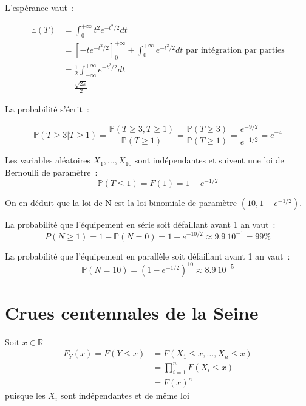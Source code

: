 L'espérance vaut~:

\begin{align*}
\mathbb{E}(T) &= \int_0^{+\infty} t^2 e^{-t^2/2} dt\\
        &= \left[-t e^{-t^2/2} \right]_0^{+\infty} + \int_0^{+\infty} e^{-t^2/2} dt \text{ par intégration par parties}\\
        &= \frac{1}{2} \int_{-\infty}^{+\infty} e^{-t^2/2} dt \\
        &= \frac{\sqrt{2\pi}}{2}
\end{align*}

\label{II-answer-dureevie2}
La probabilité s'écrit~:

\[\mathbb{P}(T\geq 3 |T \geq 1) = \frac{\mathbb{P}(T \geq 3,T \geq 1)}{\mathbb{P}(T \geq 1)} = \frac{\mathbb{P}(T \geq 3)}{\mathbb{P}(T \geq 1)} = \frac{e^{-9/2}}{e^{-1/2}} = e^{-4}\]

\label{II-answer-dureevie3}
Les variables aléatoires \(X_1 , \ldots , X_{10}\) sont indépendantes et
suivent une loi de Bernoulli de paramètre~:
\[ \mathbb{P}(T \leq 1) = F (1) = 1 - e^{- 1/2}\]

On en déduit que la loi de N est la loi binomiale de paramètre
\((10, 1 - e^{- 1/2})\).

\label{II-answer-dureevie4}
La probabilité que l'équipement en série soit défaillant avant 1 an
vaut~:
\[ P(N \geq 1) = 1 - \mathbb{P}(N = 0) = 1 - e^{-10/2} \approx 9.9 ~10^{-1} = 99\%\]

\label{II-answer-dureevie5}
La probabilité que l'équipement en parallèle soit défaillant avant 1 an
vaut~:
\[ \mathbb{P}(N = 10) = (1 - e^{-1/2})^10 \approx 8.9 ~10 ^{-5} \]

\section{Crues centennales de la
Seine}\label{II-crues-centennales-de-la-seine-1}

\label{II-answer-crue1}
Soit \(x\in \mathbb{R}\) \begin{align*}
F_Y(x) = F(Y\leq x) &= F(X_1\leq x,\ldots,X_n\leq x)\\
           &= \prod_{i=1}^n F(X_i\leq x) \\
           &= F(x)^n
\end{align*} puisque les \(X_i\) sont indépendantes et de même loi

